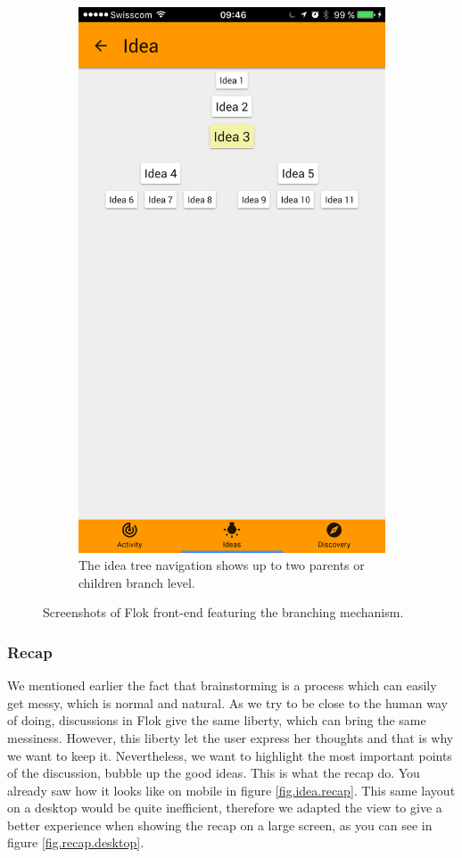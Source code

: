 \documentclass[a4paper,12pt,twoside]{article}
\begin{document}
\begin{figure}[!htb]
\begin{subfigure}[t]{.48\textwidth}
        \includegraphics[width=.67\textwidth]{images/branches_navigation.png}
        \caption{The idea tree navigation shows up to two parents or children branch level.}
    \end{subfigure}
    \caption{Screenshots of Flok front-end featuring the branching mechanism.}
    \label{fig.branches}
\end{figure}

\subsubsection{Recap}
\label{sec.recap}
We mentioned earlier the fact that brainstorming is a process which can easily get messy, which is normal and natural.
As we try to be close to the human way of doing, discussions in Flok give the same liberty, which can bring the same messiness.
However, this liberty let the user express her thoughts and that is why we want to keep it.
Nevertheless, we want to highlight the most important points of the discussion, bubble up the good ideas.
This is what the recap do.
You already saw how it looks like on mobile in figure \ref{fig.idea.recap}.
This same layout on a desktop would be quite inefficient, therefore we adapted the view to give a better experience when showing the recap on a large screen, as you can see in figure \ref{fig.recap.desktop}.
\end{document}
